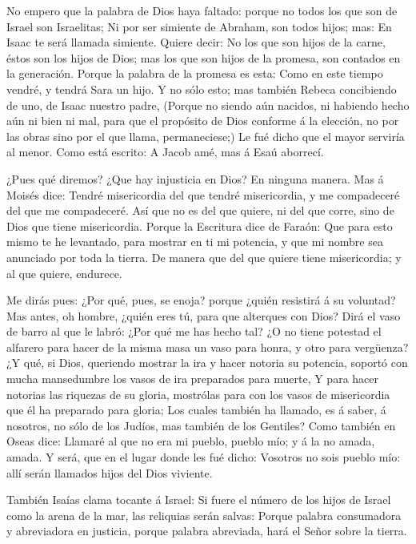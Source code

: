  No empero que la palabra de Dios haya faltado: porque no
todos los que son de Israel son Israelitas;  Ni por ser
simiente de Abraham, son todos hijos; mas: En Isaac te será llamada
simiente.  Quiere decir: No los que son hijos de la carne,
éstos son los hijos de Dios; mas los que son hijos de la promesa, son
contados en la generación.  Porque la palabra de la promesa
es esta: Como en este tiempo vendré, y tendrá Sara un hijo.
 Y no sólo esto; mas también Rebeca concibiendo de uno, de
Isaac nuestro padre,  (Porque no siendo aún nacidos, ni
habiendo hecho aún ni bien ni mal, para que el propósito de Dios
conforme á la elección, no por las obras sino por el que llama,
permaneciese;)  Le fué dicho que el mayor serviría al
menor.  Como está escrito: A Jacob amé, mas á Esaú
aborrecí.

 ¿Pues qué diremos? ¿Que hay injusticia en Dios? En ninguna
manera.  Mas á Moisés dice: Tendré misericordia del que
tendré misericordia, y me compadeceré del que me compadeceré.
 Así que no es del que quiere, ni del que corre, sino de
Dios que tiene misericordia.  Porque la Escritura dice de
Faraón: Que para esto mismo te he levantado, para mostrar en ti mi
potencia, y que mi nombre sea anunciado por toda la tierra.
 De manera que del que quiere tiene misericordia; y al que
quiere, endurece.

 Me dirás pues: ¿Por qué, pues, se enoja? porque ¿quién
resistirá á su voluntad?  Mas antes, oh hombre, ¿quién eres
tú, para que alterques con Dios? Dirá el vaso de barro al que le labró:
¿Por qué me has hecho tal?  ¿O no tiene potestad el
alfarero para hacer de la misma masa un vaso para honra, y otro para
vergüenza?  ¿Y qué, si Dios, queriendo mostrar la ira y
hacer notoria su potencia, soportó con mucha mansedumbre los vasos de
ira preparados para muerte,  Y para hacer notorias las
riquezas de su gloria, mostrólas para con los vasos de misericordia que
él ha preparado para gloria;  Los cuales también ha
llamado, es á saber, á nosotros, no sólo de los Judíos, mas también de
los Gentiles?  Como también en Oseas dice: Llamaré al que
no era mi pueblo, pueblo mío; y á la no amada, amada.  Y
será, que en el lugar donde les fué dicho: Vosotros no sois pueblo mío:
allí serán llamados hijos del Dios viviente.

 También Isaías clama tocante á Israel: Si fuere el número
de los hijos de Israel como la arena de la mar, las reliquias serán
salvas:  Porque palabra consumadora y abreviadora en
justicia, porque palabra abreviada, hará el Señor sobre la tierra.

